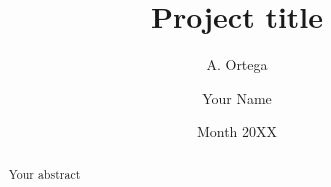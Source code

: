 \documentclass[thesis]{mas_report}
\author{A. Ortega}
\author{Your Name}
\title{Project title}
\date{Month 20XX}
\begin{document}
\begin{titlepage}
    \maketitle
\end{titlepage}




% 




\begin{abstract}
Your abstract
\end{abstract}



\tableofcontents
\listoffigures
\listoftables




\mainmatter %











\appendix
% 

\backmatter


%

\end{document}
